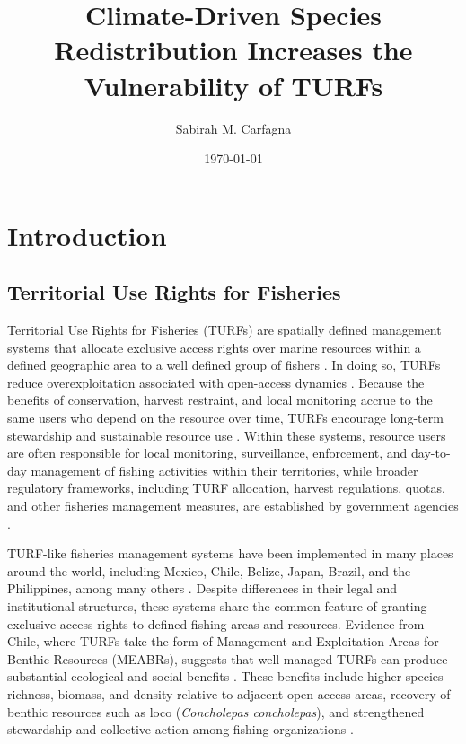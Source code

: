\documentclass[12pt]{article}
\title{Climate-Driven Species Redistribution Increases the Vulnerability of TURFs}
\author{Sabirah M. Carfagna}
\date{\today}
\begin{document}
\maketitle

\section{Introduction}

\subsection{Territorial Use Rights for Fisheries}

Territorial Use Rights for Fisheries (TURFs) are spatially defined management systems that allocate exclusive access rights over marine resources within a defined geographic area to a well defined group of fishers \citep{McCayEtAl2014, McCay2017}. In doing so, TURFs reduce overexploitation associated with open-access dynamics \citep{McCayEtAl2014, McCay2017}. Because the benefits of conservation, harvest restraint, and local monitoring accrue to the same users who depend on the resource over time, TURFs encourage long-term stewardship and sustainable resource use \citep{Gelcich2015, Viana2019}. Within these systems, resource users are often responsible for local monitoring, surveillance, enforcement, and day-to-day management of fishing activities within their territories, while broader regulatory frameworks, including TURF allocation, harvest regulations, quotas, and other fisheries management measures, are established by government agencies \citep{McCay2017, McCayEtAl2014, Ojea2017, Gelcich2015}.

TURF-like fisheries management systems have been implemented in many places around the world, including Mexico, Chile, Belize, Japan, Brazil, and the Philippines, among many others \citep{Aceves-Bueno2017-qb, Wade2019, Matsuda2010, Siar1992}. Despite differences in their legal and institutional structures, these systems share the common feature of granting exclusive access rights to defined fishing areas and resources. Evidence from Chile, where TURFs take the form of Management and Exploitation Areas for Benthic Resources (MEABRs), suggests that well-managed TURFs can produce substantial ecological and social benefits \citep{Gelcich2008, Gelcich2010, Gelcich2015}. These benefits include higher species richness, biomass, and density relative to adjacent open-access areas, recovery of benthic resources such as loco (\textit{Concholepas concholepas}), and strengthened stewardship and collective action among fishing organizations \citep{Gelcich2008, Gelcich2010, Gelcich2015}.
\end{document}
